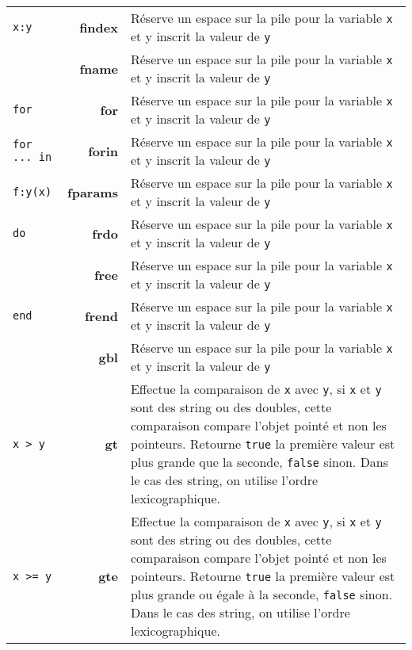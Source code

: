 \documentclass{article}
\begin{document}
\begin{longtable}{p{1.3cm} r p{12cm}}
  {\lstset{style=lua}\lstinline$x:y$} & \textbf{findex} & Réserve un espace sur la pile pour la variable \texttt{x} et y inscrit la valeur de \texttt{y}\\
  {\lstset{style=lua}\lstinline$$} & \textbf{fname} & Réserve un espace sur la pile pour la variable \texttt{x} et y inscrit la valeur de \texttt{y}\\
  {\lstset{style=lua}\lstinline$for$} & \textbf{for} & Réserve un espace sur la pile pour la variable \texttt{x} et y inscrit la valeur de \texttt{y}\\
  {\lstset{style=lua}\lstinline$for ... in$} & \textbf{forin} & Réserve un espace sur la pile pour la variable \texttt{x} et y inscrit la valeur de \texttt{y}\\
  {\lstset{style=lua}\lstinline$f:y(x)$} & \textbf{fparams} & Réserve un espace sur la pile pour la variable \texttt{x} et y inscrit la valeur de \texttt{y}\\
  {\lstset{style=lua}\lstinline$do$} & \textbf{frdo} & Réserve un espace sur la pile pour la variable \texttt{x} et y inscrit la valeur de \texttt{y}\\
  {\lstset{style=lua}\lstinline$$} & \textbf{free} & Réserve un espace sur la pile pour la variable \texttt{x} et y inscrit la valeur de \texttt{y}\\
  {\lstset{style=lua}\lstinline$end$} & \textbf{frend} & Réserve un espace sur la pile pour la variable \texttt{x} et y inscrit la valeur de \texttt{y}\\
  {\lstset{style=lua}\lstinline$$} & \textbf{gbl} & Réserve un espace sur la pile pour la variable \texttt{x} et y inscrit la valeur de \texttt{y}\\
  {\lstinline$x > y$} & \textbf{gt} & Effectue la comparaison de \texttt{x} avec \texttt{y}, si \texttt{x} et \texttt{y} sont des string ou des doubles, cette comparaison compare l'objet pointé et non les pointeurs. Retourne {\lstset{style=lua}\lstinline$true$} la première valeur est plus grande que la seconde, {\lstset{style=lua}\lstinline$false$} sinon. Dans le cas des string, on utilise l'ordre lexicographique.\\
  {\lstinline$x >= y$} & \textbf{gte} & Effectue la comparaison de \texttt{x} avec \texttt{y}, si \texttt{x} et \texttt{y} sont des string ou des doubles, cette comparaison compare l'objet pointé et non les pointeurs. Retourne {\lstset{style=lua}\lstinline$true$} la première valeur est plus grande ou égale à la seconde, {\lstset{style=lua}\lstinline$false$} sinon. Dans le cas des string, on utilise l'ordre lexicographique.\\

\end{longtable}
\end{document}
